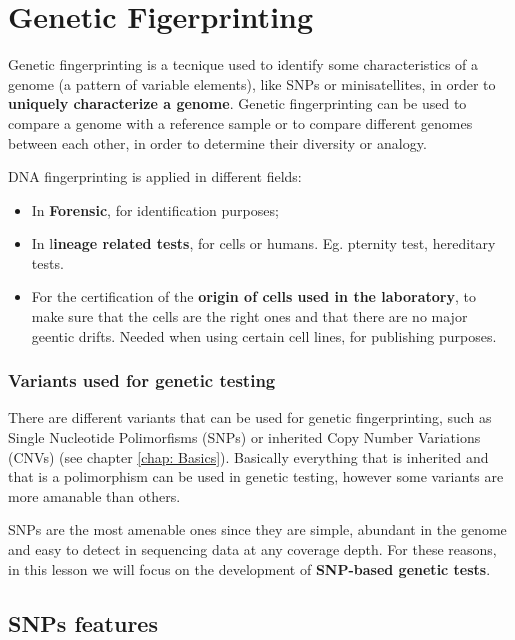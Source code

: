 \graphicspath{{chapters/GeneticFingImages/}}
\chapter{Genetic Figerprinting}

Genetic fingerprinting is a tecnique used to identify some characteristics of a
genome (a pattern of variable elements), like SNPs or minisatellites, in order
to \textbf{uniquely characterize a genome}. Genetic fingerprinting can be used
to compare a genome with a reference sample or to compare different genomes
between each other, in order to determine their diversity or analogy. 

DNA fingerprinting is applied in different fields:

\begin{itemize}
	\item In \textbf{Forensic}, for identification purposes;
	\item In l\textbf{ineage related tests}, for cells or humans. Eg. pternity
	test, hereditary tests.
	\item For the certification of the \textbf{origin of cells used in the
	laboratory}, to make sure that the cells are the right ones and that there
	are no major geentic drifts. Needed when using certain cell lines, for
	publishing purposes.
\end{itemize}


\subsection{Variants used for genetic testing}

There are different variants that can be used for genetic fingerprinting, such
as Single Nucleotide Polimorfisms (SNPs) or inherited Copy Number Variations
(CNVs) (see chapter \ref{chap: Basics}). Basically everything that is inherited
and that is a polimorphism can be used in genetic testing, however some variants
are more amanable than others. 

SNPs are the most amenable ones since they are simple, abundant in the genome
and easy to detect in sequencing data at any coverage depth. For these reasons,
in this lesson we will focus on the development of \textbf{SNP-based genetic
tests}.

\section{SNPs features}

